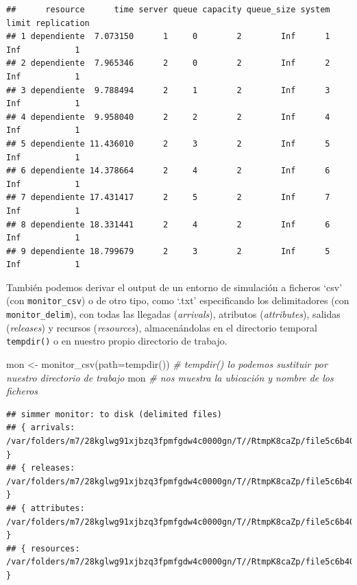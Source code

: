 \documentclass[
]{book}
\newenvironment{Shaded}{\begin{snugshade}}{\end{snugshade}}
\newcommand{\AttributeTok}[1]{\textcolor[rgb]{0.77,0.63,0.00}{#1}}
\newcommand{\CommentTok}[1]{\textcolor[rgb]{0.56,0.35,0.01}{\textit{#1}}}
\newcommand{\FunctionTok}[1]{\textcolor[rgb]{0.00,0.00,0.00}{#1}}
\newcommand{\NormalTok}[1]{#1}
\newcommand{\OtherTok}[1]{\textcolor[rgb]{0.56,0.35,0.01}{#1}}
\theoremstyle{definition}
\theoremstyle{definition}
\theoremstyle{definition}
\theoremstyle{definition}
\theoremstyle{remark}
\begin{document}
\begin{verbatim}
##      resource      time server queue capacity queue_size system limit replication
## 1 dependiente  7.073150      1     0        2        Inf      1   Inf           1
## 2 dependiente  7.965346      2     0        2        Inf      2   Inf           1
## 3 dependiente  9.788494      2     1        2        Inf      3   Inf           1
## 4 dependiente  9.958040      2     2        2        Inf      4   Inf           1
## 5 dependiente 11.436010      2     3        2        Inf      5   Inf           1
## 6 dependiente 14.378664      2     4        2        Inf      6   Inf           1
## 7 dependiente 17.431417      2     5        2        Inf      7   Inf           1
## 8 dependiente 18.331441      2     4        2        Inf      6   Inf           1
## 9 dependiente 18.799679      2     3        2        Inf      5   Inf           1
\end{verbatim}

También podemos derivar el output de un entorno de simulación a ficheros `csv' (con \texttt{monitor\_csv}) o de otro tipo, como `.txt' especificando los delimitadores (con \texttt{monitor\_delim}), con todas las llegadas (\emph{arrivals}), atributos (\emph{attributes}), salidas (\emph{releases}) y recursos (\emph{resources}), almacenándolas en el directorio temporal \texttt{tempdir()} o en nuestro propio directorio de trabajo.

\begin{Shaded}
\begin{Highlighting}[]
\NormalTok{mon }\OtherTok{\textless{}{-}} \FunctionTok{monitor\_csv}\NormalTok{(}\AttributeTok{path=}\FunctionTok{tempdir}\NormalTok{()) }\CommentTok{\# tempdir() lo podemos sustituir por nuestro directorio de trabajo}
\NormalTok{mon   }\CommentTok{\# nos muestra la ubicación y nombre de los ficheros}
\end{Highlighting}
\end{Shaded}

\begin{verbatim}
## simmer monitor: to disk (delimited files)
## { arrivals: /var/folders/m7/28kglwg91xjbzq3fpmfgdw4c0000gn/T//RtmpK8caZp/file5c6b40a1517c_arrivals.csv }
## { releases: /var/folders/m7/28kglwg91xjbzq3fpmfgdw4c0000gn/T//RtmpK8caZp/file5c6b40a1517c_releases.csv }
## { attributes: /var/folders/m7/28kglwg91xjbzq3fpmfgdw4c0000gn/T//RtmpK8caZp/file5c6b40a1517c_attributes.csv }
## { resources: /var/folders/m7/28kglwg91xjbzq3fpmfgdw4c0000gn/T//RtmpK8caZp/file5c6b40a1517c_resources.csv }
\end{verbatim}
\end{document}
